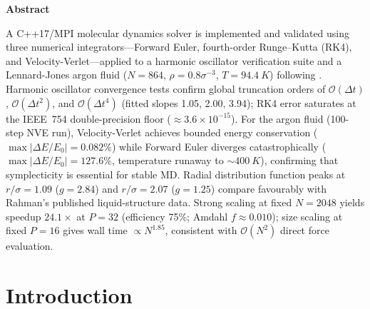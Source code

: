 \documentclass[10pt,twocolumn]{article}
\begin{document}
\begin{center}
  \begin{minipage}{0.88\textwidth}
    \setlength{\parindent}{0pt}
    {\bfseries Abstract}\medskip

    A C++17/MPI molecular dynamics solver is implemented and validated
    using three numerical integrators---Forward Euler, fourth-order
    Runge--Kutta (RK4), and Velocity-Verlet---applied to a harmonic oscillator
    verification suite and a Lennard-Jones argon fluid ($N=864$,
    $\rho=0.8\sigma^{-3}$, $T=\SI{94.4}{K}$) following \citealt{Rahman1964}.
    Harmonic oscillator convergence tests confirm global truncation orders of
    $\mathcal{O}(\Delta t)$, $\mathcal{O}(\Delta t^2)$, and
    $\mathcal{O}(\Delta t^4)$ (fitted slopes 1.05, 2.00, 3.94); RK4 error
    saturates at the IEEE~754 double-precision floor (${\approx}3.6\times10^{-15}$).
    For the argon fluid (100-step NVE run), Velocity-Verlet achieves bounded
    energy conservation ($\max|\Delta E/E_0|=0.082\%$) while Forward Euler
    diverges catastrophically ($\max|\Delta E/E_0|=127.6\%$, temperature runaway
    to ${\sim}\SI{400}{K}$), confirming that symplecticity is essential for
    stable MD.
    Radial distribution function peaks at $r/\sigma=1.09$ ($g=2.84$) and
    $r/\sigma=2.07$ ($g=1.25$) compare favourably with Rahman's published
    liquid-structure data.
    Strong scaling at fixed $N=2048$ yields speedup $24.1\times$ at $P=32$
    (efficiency 75\%; Amdahl $f\approx0.010$); size scaling at fixed $P=16$
    gives wall time $\propto N^{1.85}$, consistent with $\mathcal{O}(N^2)$
    direct force evaluation.
  \end{minipage}
\end{center}

\vfill
\clearpage

\thispagestyle{empty}
\setlength{\columnseprule}{0pt}
\tableofcontents
\vfill
\clearpage

\twocolumn
\hypersetup{pageanchor=true}
\setcounter{page}{1}
\thispagestyle{fancy}

\section{Introduction}
\label{sec:intro}
\end{document}
